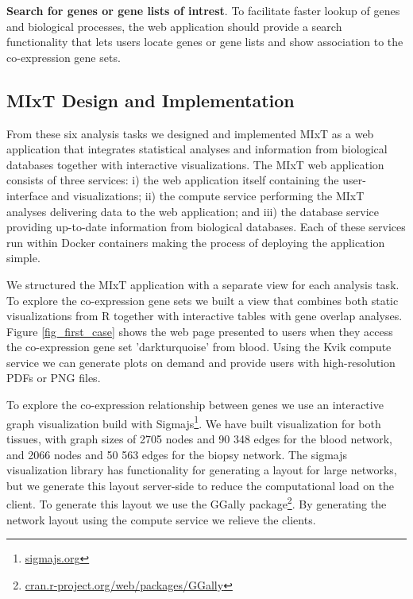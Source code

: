\textbf{Search for genes or gene lists of intrest}. To facilitate faster lookup
of genes and biological processes, the web application should provide a search
functionality that lets users locate genes or gene lists and show association to
the co-expression gene sets. 



\subsection*{MIxT Design and Implementation} 


From these six analysis tasks we designed and implemented MIxT as a web
application that integrates statistical analyses and information from biological
databases together with interactive visualizations.
The MIxT web application
consists of three services: i) the web application itself containing the
user-interface and visualizations; ii) the compute service performing the MIxT
analyses delivering data to the web application; and iii) the database service
providing up-to-date information from biological databases. Each of these
services run within Docker containers making the process of deploying the
application simple. 


We structured the MIxT application with a separate view for each analysis task.
To explore the co-expression gene sets we built a view that combines both static
visualizations from R together with interactive tables with gene overlap
analyses. Figure \ref{fig_first_case} shows the web page presented to users when
they access the co-expression gene set 'darkturquoise' from blood. Using the
Kvik compute service we can generate plots on demand and provide users with
high-resolution PDFs or PNG files. 

To explore the co-expression relationship between genes we use an interactive
graph visualization build with Sigmajs\footnote{\url{sigmajs.org}}. We have
built visualization for both tissues, with graph sizes of 2705 nodes and 90 348
edges for the blood network, and 2066 nodes and 50 563 edges for the biopsy
network. The sigmajs visualization library has functionality for generating a
layout for large networks, but we generate this layout server-side to reduce the
computational load on the client. To generate this layout we use the GGally
package\footnote{\url{cran.r-project.org/web/packages/GGally}}. By generating
the network layout using the compute service we relieve the clients.

